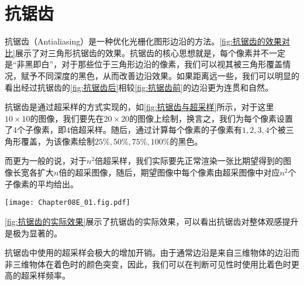 \section{抗锯齿}
抗锯齿（Antialiasing）是一种优化光栅化图形边沿的方法。\cref{fig:抗锯齿的效果对比}展示了对三角形抗锯齿的效果。抗锯齿的核心思想就是，每个像素并不一定是“非黑即白”，对于那些位于三角形边沿的像素，我们可以视其被三角形覆盖情况，赋予不同深度的黑色，从而改善边沿效果。如果距离远一些，我们可以明显的看出经过抗锯齿的\cref{fig:抗锯齿后}相较\cref{fig:抗锯齿前}的边沿更为连贯和自然。

\begin{Figure}[抗锯齿的效果对比]
\end{Figure}

抗锯齿是通过超采样的方式实现的，如\cref{fig:抗锯齿与超采样}所示，对于这里$10\times 10$的图像，我们要先在$20\times 20$的图像上绘制，换言之，我们为每个像素设置了$4$个子像素，即$4$倍超采样。随后，通过计算每个像素的子像素有$1,2,3,4$个被三角形覆盖，为该像素绘制$25\%,50\%,75\%,100\%$的黑色。

而更为一般的说，对于$n^2$倍超采样，我们实际要先正常渲染一张比期望得到的图像长宽各扩大$n$倍的超采图像，随后，期望图像中每个像素由超采图像中对应$n^2$个子像素的平均给出。

\begin{Figure}[抗锯齿与超采样]
    \texttt{[image: Chapter08E\_01.fig.pdf]}
\end{Figure}

\cref{fig:抗锯齿的实际效果}展示了抗锯齿的实际效果，可以看出抗锯齿对整体观感提升是极为显著的。

\begin{Figure}[抗锯齿的实际效果]
\end{Figure}


抗锯齿中使用的超采样会极大的增加开销。由于通常边沿是来自三维物体的边沿而非三维物体在着色时的颜色突变，因此，我们可以在判断可见性时使用比着色时更高的超采样频率。
